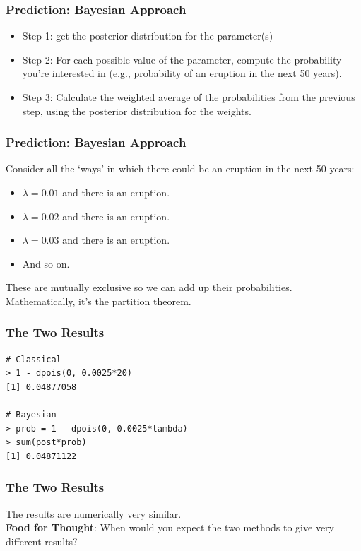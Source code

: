 \documentclass{beamer}
\begin{document}
\begin{frame}
\frametitle{Prediction: Bayesian Approach}

\begin{itemize}
\item Step 1: get the posterior distribution for the parameter(s)\pause
\item Step 2: For each possible value of the parameter, compute the probability
you're interested in (e.g., probability of an eruption in the next 50
years).\pause
\item Step 3: Calculate the weighted average of the probabilities from the previous
step, using the posterior distribution for the weights.
\end{itemize}

\end{frame}


\begin{frame}
\frametitle{Prediction: Bayesian Approach}
Consider all the `ways' in which there could be an eruption in the next 50 years:
\begin{itemize}
\item $\lambda=0.01$ and there is an eruption.\pause
\item $\lambda=0.02$ and there is an eruption.\pause
\item $\lambda=0.03$ and there is an eruption.\pause
\item And so on.
\end{itemize}
These are mutually exclusive so we can add up their probabilities.
Mathematically, it's the partition theorem.

\end{frame}

\begin{frame}[fragile]
\frametitle{The Two Results}

\begin{verbatim}
# Classical
> 1 - dpois(0, 0.0025*20)
[1] 0.04877058

# Bayesian
> prob = 1 - dpois(0, 0.0025*lambda)
> sum(post*prob)
[1] 0.04871122
\end{verbatim}

\end{frame}

\begin{frame}[fragile]
\frametitle{The Two Results}
The results are numerically very similar.\\
{\bf Food for Thought}: When would you expect the two methods to give very
different results?

\end{frame}
\end{document}
